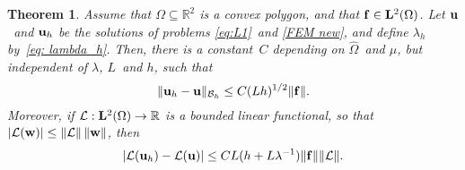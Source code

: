 \documentclass[11pt]{article}
\newcommand{\calB}{\mathcal{B}}
\newcommand{\calL}{\mathcal{L}}
\newcommand{\vf}{{\bf f}}
\newcommand{\vu}{{\bf u}}
\newcommand{\vw}{{\bf w}}
\newcommand{\R}{\mathbb{R}}
\numberwithin{equation}{section}
\newtheorem{theorem}{Theorem}[section]
\begin{document}
\begin{theorem}\label{Convergence theorem}
Assume that $\Omega\subseteq\mathbb{R}^2$ is a convex polygon, and that
$\vf\in\mathbf{L}^2(\Omega)$. Let $\vu$~and $\vu_h$ be the solutions of problems
\eqref{eq:L1}~and \eqref{FEM new}, and define
$\lambda_h$ by~\eqref{eq: lambda_h}.
Then, there is a constant~$C$ depending on $\widehat\Omega$~and $\mu$, but
independent of $\lambda$, $L$~and $h$, such that
\begin{equation}\label{h1 error}
\|\vu_h-\vu\|_{\calB_h}\le C(Lh)^{1/2}\|\vf\|.
\end{equation}
Moreover, if $\calL:{\bf L}^2(\Omega) \to \R$ is a bounded  linear functional,
so that $|\calL(\vw)|\le \|\calL\|\,\|\vw\|$, then
\begin{equation}\label{convergence calL}
|\calL(\vu_h)-\calL(\vu)|\le CL(h+L\lambda^{-1})\|\vf\|\|\calL\|.
\end{equation}
\end{theorem}
\end{document}
